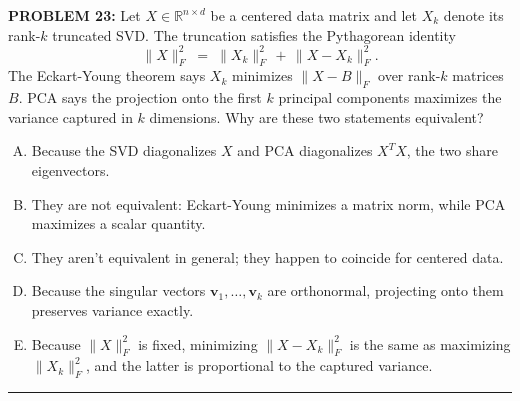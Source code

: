 \documentclass[12pt]{amsart}
\newcommand{\divider}{
  \vspace{-1em} %
  \noindent
  \raisebox{-0.15ex}{\textbullet}%
  \hspace{0.5em}%
  \rule[0.5ex]{0.95\textwidth}{1.0pt}%
  \hspace{0.5em}%
  \raisebox{-0.15ex}{\textbullet}%
  \vspace{0em} %
}
\begin{document}
\newpage


{\bf PROBLEM 23:}
Let $X \in \mathbb{R}^{n \times d}$ be a centered data matrix and let $X_k$ denote its 
rank-$k$ truncated SVD. The truncation satisfies the Pythagorean identity
$$\|X\|_F^2 \;=\; \|X_k\|_F^2 \,+\, \|X - X_k\|_F^2.$$
The Eckart-Young theorem says $X_k$ minimizes $\|X - B\|_F$ over rank-$k$ matrices $B$. 
PCA says the projection onto the first $k$ principal components maximizes the variance 
captured in $k$ dimensions. Why are these two statements equivalent?
\begin{enumerate}[(A)]
\item Because the SVD diagonalizes $X$ and PCA diagonalizes $X^TX$, the two share eigenvectors.
\item They are not equivalent: Eckart-Young minimizes a matrix norm, while PCA maximizes a 
scalar quantity.
\item They aren't equivalent in general; they happen to coincide for centered data.
\item Because the singular vectors $\mathbf{v}_1, \ldots, \mathbf{v}_k$ are orthonormal, 
projecting onto them preserves variance exactly.
\item Because $\|X\|_F^2$ is fixed, minimizing $\|X - X_k\|_F^2$ is the same as maximizing 
$\|X_k\|_F^2$, and the latter is proportional to the captured variance.
\end{enumerate}
%
\divider
\end{document}
